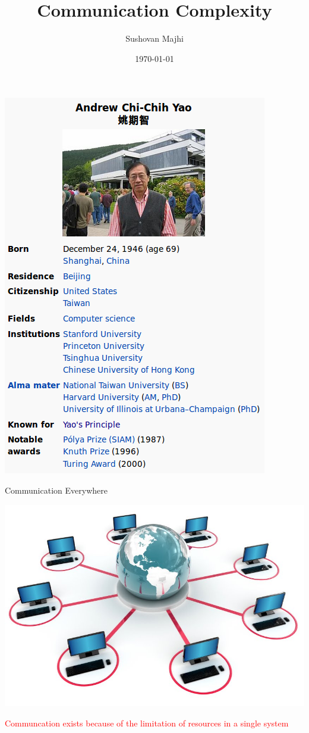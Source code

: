 \documentclass[9pt]{beamer}
\begin{document}
\title{Communication Complexity} 
\author{Sushovan Majhi}
\date{\today} 
\frame{\titlepage} 

\begin{frame}
  \begin{center}
    \includegraphics[scale=0.4]{yao.png}
  \end{center}
\end{frame}

\begin{frame}{Communication Everywhere}
  \begin{center}
    \includegraphics[scale=0.2]{network.jpg}
  \end{center}
  \textcolor{red}{Communcation exists because of the limitation of resources in a 
    single system}
\end{frame}
\end{document}
